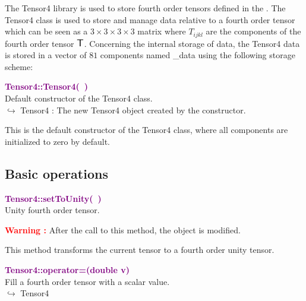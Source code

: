 The Tensor4 library is used to store fourth order tensors defined in the \DynELA.
The Tensor4 class is used to store and manage data relative to a fourth order tensor which can be seen as a $3\times3\times3\times3$ matrix where $T_{ijkl}$ are the components of the fourth order tensor $\mbox{\large\ensuremath{\mathsf{T}}}$.
Concerning the internal storage of data, the Tensor4 data is stored in a vector of $81$ components named \textsf{\_data} using the following storage scheme:



\textcolor{purple}{\textbf{Tensor4::Tensor4(~)}}\label{Tensor4::Tensor4()}\\
Default constructor of the Tensor4 class.\\ \hspace*{10mm}$\hookrightarrow$ Tensor4 : The new Tensor4 object created by the constructor.

This is the default constructor of the Tensor4 class, where all components are initialized to zero by default.

\subsection{Basic operations}

\textcolor{purple}{\textbf{Tensor4::setToUnity(~)}}\label{Tensor4::setToUnity()}\\
Unity fourth order tensor.

\hspace*{10mm}\textcolor{red}{\textbf{Warning :}} After the call to this method, the object is modified.

This method transforms the current tensor to a fourth order unity tensor.

\textcolor{purple}{\textbf{Tensor4::operator=(double v)}}\label{Tensor4::operator=(double v)}\\
Fill a fourth order tensor with a scalar value.\\ \hspace*{10mm}$\hookrightarrow$ Tensor4

